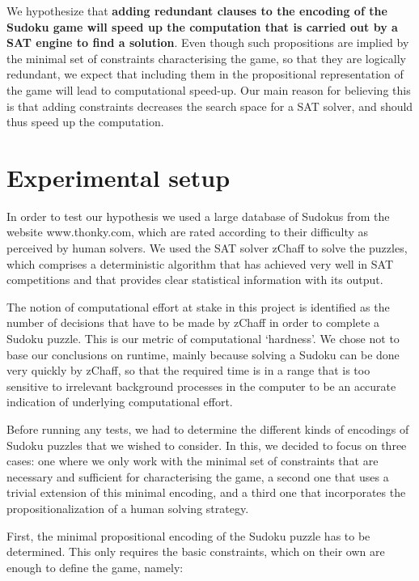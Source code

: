 \documentclass[10pt,a4paper,leqno]{article}
\begin{document}
We hypothesize that \textbf{adding redundant clauses to the encoding of the Sudoku game will speed up the computation that is carried out by a SAT engine to find a solution}. Even though such propositions are implied by the minimal set of constraints characterising the game, so that they are logically redundant, we expect that including them in the propositional representation of the game will lead to computational speed-up. Our main reason for believing this is that adding constraints decreases the search space for a SAT solver, and should thus speed up the computation. 

\section*{Experimental setup}

 
In order to test our hypothesis we used a large database of Sudokus from the website www.thonky.com, which are rated according to their difficulty as perceived by human solvers. We used the SAT solver zChaff to solve the puzzles, which comprises a deterministic algorithm that has achieved very well in SAT competitions and that provides clear statistical information with its output. 

The notion of computational effort at stake in this project is identified as the number of decisions that have to be made by zChaff in order to complete a Sudoku puzzle. This is our metric of computational `hardness'. We chose not to base our conclusions on runtime, mainly because solving a Sudoku can be done very quickly by zChaff, so that the required time is in a range that is too sensitive to irrelevant background processes in the computer to be an accurate indication of underlying computational effort. 

Before running any tests, we had to determine the different kinds of encodings of Sudoku puzzles that we wished to consider. In this, we decided to focus on three cases: one where we only work with the minimal set of constraints that are necessary and sufficient for characterising the game, a second one that uses a trivial extension of this minimal encoding, and a third one that incorporates the propositionalization of a human solving strategy. 
 

First, the minimal propositional encoding of the Sudoku puzzle has to be determined. This only requires the basic constraints, which on their own are enough to define the game, namely:
\end{document}
